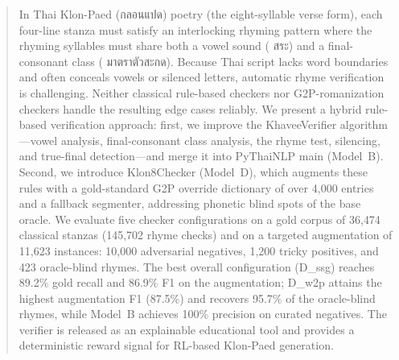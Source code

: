 \documentclass[conference]{IEEEtran}
\newcommand{\thtxt}[1]{{\thaifont #1}}      %
\newcommand{\thpar}[2]{(\textipa{#1} \thtxt{#2})}     %
\newcommand{\thtxt}[1]{}
\newcommand{\thpar}[2]{(#1)}
\begin{document}
\author{
}

\maketitle

\begin{abstract}
In Thai Klon-Paed (\thtxt{กลอนแปด}) poetry (the eight-syllable verse form), each four-line stanza must satisfy an interlocking rhyming pattern
where the rhyming syllables must share both a vowel sound \thpar{s\`ar\`a}{สระ} and a final-consonant
class \thpar{m\^a:ttra:}{มาตราตัวสะกด}. Because Thai script lacks word boundaries
and often conceals vowels or silenced letters, automatic rhyme verification is challenging.
Neither classical rule-based checkers nor G2P-romanization checkers handle the resulting edge cases
reliably. We present a hybrid rule-based verification approach: first, we
improve the KhaveeVerifier algorithm---vowel analysis,
final-consonant class analysis, the rhyme test,  silencing, and
true-final detection---and merge it into PyThaiNLP main (Model~B). Second,
we introduce Klon8Checker (Model~D), which augments these rules with a
gold-standard G2P override dictionary of over 4{,}000 entries and a
fallback segmenter, addressing phonetic blind spots of the base oracle. We evaluate
five checker configurations on a gold corpus of 36{,}474 classical stanzas
(145{,}702 rhyme checks) and on a targeted augmentation of 11{,}623
instances: 10{,}000 adversarial negatives, 1{,}200 tricky positives, and
423 oracle-blind rhymes. The best overall configuration (D\_ssg) reaches
89.2\% gold recall and 86.9\% F1 on the augmentation; D\_w2p attains the
highest augmentation F1 (87.5\%) and recovers 95.7\% of the oracle-blind
rhymes, while Model~B achieves 100\% precision on curated negatives. The
verifier is released as an explainable
educational tool and provides a deterministic reward signal for RL-based
Klon-Paed generation.
\end{abstract}
\end{document}
